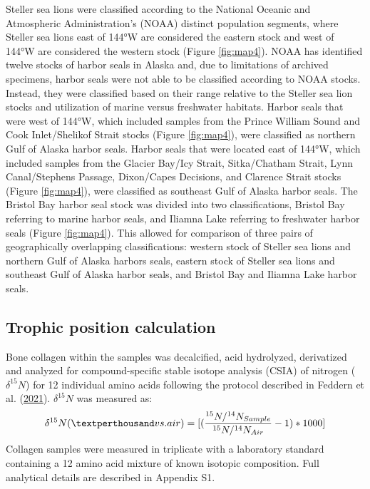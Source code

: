 \documentclass [11pt, proquest] {uwthesis}[2015/03/03]
\begin{document}
Steller sea lions were classified according to the National Oceanic and
Atmospheric Administration's (NOAA) distinct population segments, where
Steller sea lions east of 144°W are considered the eastern stock and
west of 144°W are considered the western stock (Figure \ref{fig:map4}).
NOAA has identified twelve stocks of harbor seals in Alaska and, due to
limitations of archived specimens, harbor seals were not able to be
classified according to NOAA stocks. Instead, they were classified based
on their range relative to the Steller sea lion stocks and utilization
of marine versus freshwater habitats. Harbor seals that were west of
144°W, which included samples from the Prince William Sound and Cook
Inlet/Shelikof Strait stocks (Figure \ref{fig:map4}), were classified as
northern Gulf of Alaska harbor seals. Harbor seals that were located
east of 144°W, which included samples from the Glacier Bay/Icy Strait,
Sitka/Chatham Strait, Lynn Canal/Stephens Passage, Dixon/Capes
Decisions, and Clarence Strait stocks (Figure \ref{fig:map4}), were
classified as southeast Gulf of Alaska harbor seals. The Bristol Bay
harbor seal stock was divided into two classifications, Bristol Bay
referring to marine harbor seals, and Iliamna Lake referring to
freshwater harbor seals (Figure \ref{fig:map4}). This allowed for
comparison of three pairs of geographically overlapping classifications:
western stock of Steller sea lions and northern Gulf of Alaska harbors
seals, eastern stock of Steller sea lions and southeast Gulf of Alaska
harbor seals, and Bristol Bay and Iliamna Lake harbor seals.

\subsection{Trophic position
calculation}\label{trophic-position-calculation}

Bone collagen within the samples was decalcified, acid hydrolyzed,
derivatized and analyzed for compound-specific stable isotope analysis
(CSIA) of nitrogen (\(\delta^{15}N\)) for 12 individual amino acids
following the protocol described in Feddern et al.
(\protect\hyperlink{ref-Feddern2021}{2021}). \(\delta^{15}N\) was
measured as:
\begin{equation} 
  \delta^{15}N ( \textperthousand vs. air) =   
  [(\frac{^{15}N/^{14}N_{Sample}}{^{15}N/^{14}N_{Air}} -1)*1000]
  \label{eq:deltN2}
\end{equation}
Collagen samples were measured in triplicate with a laboratory standard
containing a 12 amino acid mixture of known isotopic composition. Full
analytical details are described in Appendix S1.
\end{document}

